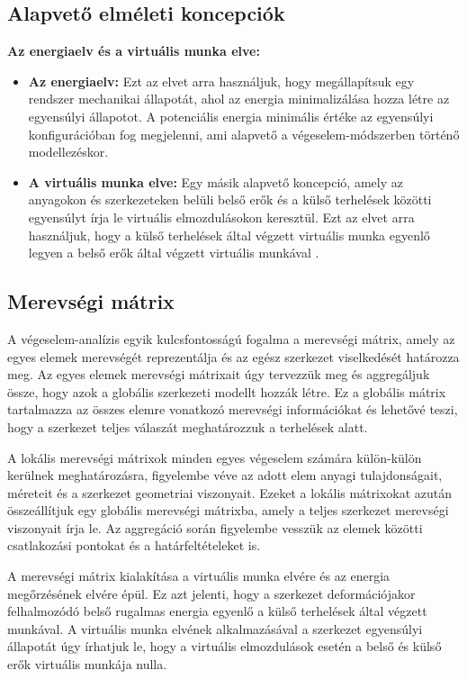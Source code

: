 \documentclass[12pt,a4paper,oneside]{report}
\begin{document}
\subsection{Alapvető elméleti koncepciók}
\textbf{Az energiaelv és a virtuális munka elve:}
\begin{itemize}
    \item \textbf{Az energiaelv:} Ezt az elvet arra használjuk, hogy megállapítsuk egy rendszer mechanikai állapotát, ahol az energia minimalizálása hozza létre az egyensúlyi állapotot. A potenciális energia minimális értéke az egyensúlyi konfigurációban fog megjelenni, ami alapvető a végeselem-módszerben történő modellezéskor.
    \item \textbf{A virtuális munka elve:} Egy másik alapvető koncepció, amely az anyagokon és szerkezeteken belüli belső erők és a külső terhelések közötti egyensúlyt írja le virtuális elmozdulásokon keresztül. Ezt az elvet arra használjuk, hogy a külső terhelések által végzett virtuális munka egyenlő legyen a belső erők által végzett virtuális munkával \cite{voros2012veges,pere2011vem}.
\end{itemize}
\newpage

\subsection{Merevségi mátrix}
A végeselem-analízis egyik kulcsfontosságú fogalma a merevségi mátrix, amely az egyes elemek merevségét reprezentálja és az egész szerkezet viselkedését határozza meg. Az egyes elemek merevségi mátrixait úgy tervezzük meg és aggregáljuk össze, hogy azok a globális szerkezeti modellt hozzák létre. Ez a globális mátrix tartalmazza az összes elemre vonatkozó merevségi információkat és lehetővé teszi, hogy a szerkezet teljes válaszát meghatározzuk a terhelések alatt.

A lokális merevségi mátrixok minden egyes végeselem számára külön-külön kerülnek meghatározásra, figyelembe véve az adott elem anyagi tulajdonságait, méreteit és a szerkezet geometriai viszonyait. Ezeket a lokális mátrixokat azután összeállítjuk egy globális merevségi mátrixba, amely a teljes szerkezet merevségi viszonyait írja le. Az aggregáció során figyelembe vesszük az elemek közötti csatlakozási pontokat és a határfeltételeket is.

A merevségi mátrix kialakítása a virtuális munka elvére és az energia megőrzésének elvére épül. Ez azt jelenti, hogy a szerkezet deformációjakor felhalmozódó belső rugalmas energia egyenlő a külső terhelések által végzett munkával. A virtuális munka elvének alkalmazásával a szerkezet egyensúlyi állapotát úgy írhatjuk le, hogy a virtuális elmozdulások esetén a belső és külső erők virtuális munkája nulla.
\end{document}
